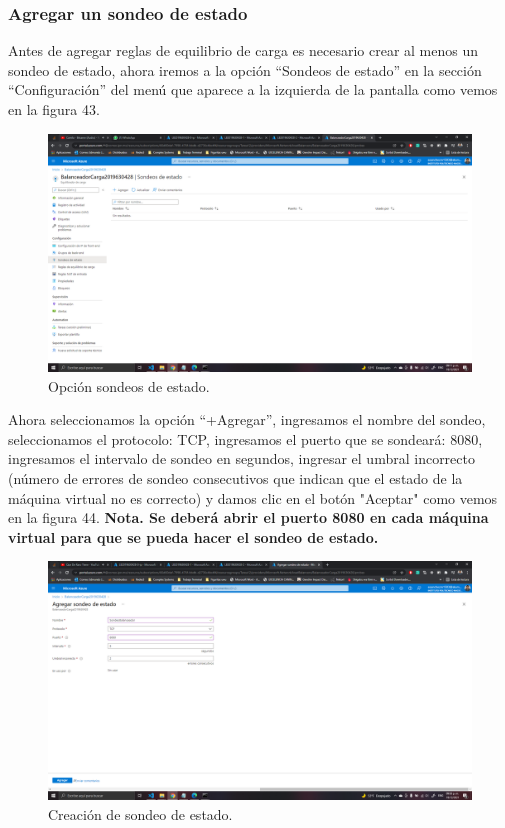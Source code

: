 \documentclass[11pt]{article}
\begin{document}
			\subsubsection{Agregar un sondeo de estado}
			Antes de agregar reglas de equilibrio de carga es necesario crear al menos un sondeo de estado, ahora iremos a la opción ``Sondeos de estado'' en la sección ``Configuración'' del menú que aparece a la izquierda de la pantalla como vemos en la figura 43.
			\begin{figure}[H]
				\centering
				\includegraphics[scale=0.34]{resources/sondeoBalanceador1-3.png}
				\caption{Opción sondeos de estado.}\label{fig:picture}
			\end{figure}
			Ahora seleccionamos la opción ``+Agregar'', ingresamos el nombre del sondeo, seleccionamos el protocolo: TCP, ingresamos el puerto que se sondeará: 8080, ingresamos el intervalo de sondeo en segundos, ingresar el umbral incorrecto (número de errores de sondeo consecutivos que indican que el estado de la máquina virtual no es correcto) y damos clic en el botón "Aceptar" como vemos en la figura 44. \textbf{Nota. Se deberá abrir el puerto 8080 en cada máquina virtual para que se pueda hacer el sondeo de estado.}
			\begin{figure}[H]
				\centering
				\includegraphics[scale=0.34]{resources/sondeoBalanceador4-9.png}
				\caption{Creación de sondeo de estado.}\label{fig:picture}
			\end{figure}
\end{document}
